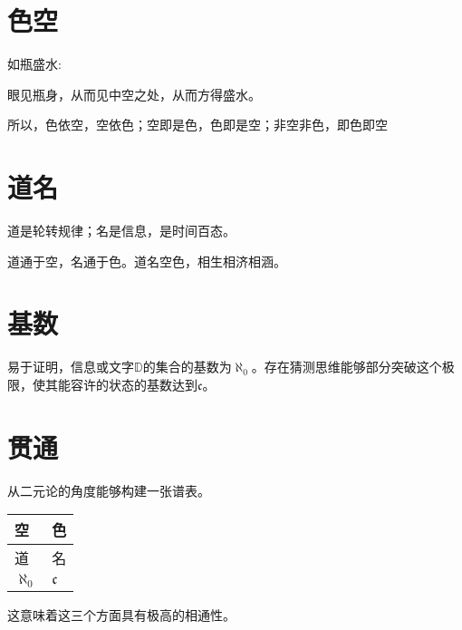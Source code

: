 \documentclass{ctexart}
\begin{document}
\section{色空}

如瓶盛水:

眼见瓶身，从而见中空之处，从而方得盛水。

所以，色依空，空依色；空即是色，色即是空；非空非色，即色即空

\section{道名}

道是轮转规律；名是信息，是时间百态。

道通于空，名通于色。道名空色，相生相济相涵。

\section{基数}

易于证明，信息或文字$\mathbb{D}$的集合的基数为$\aleph_0$。存在猜测思维能够部分突破这个极限，使其能容许的状态的基数达到$\mathfrak{c}$。

\section{贯通}

从二元论的角度能够构建一张谱表。

\begin{table}[h]
    \centering
    \begin{tabular}{|l|l|}
        \hline
        空 & 色 \\
        \hline
        道 & 名 \\
        \hline
        $\aleph_0$ & $\mathfrak{c}$ \\
        \hline
    \end{tabular}
\end{table}

这意味着这三个方面具有极高的相通性。
\end{document}
